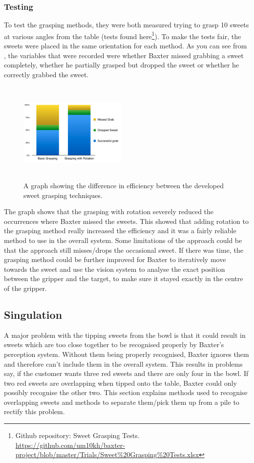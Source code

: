 \subsubsection{Testing}
To test the grasping methods, they were both measured trying to grasp 10 sweets at various angles from the table (tests found here\footnote{Github repository: Sweet Grasping Tests. \url{https://github.com/um10kh/baxter-project/blob/master/Trials/Sweet\%20Grasping\%20Tests.xlsx}}). To make the tests fair, the sweets were placed in the same orientation for each method. As you can see from \textbf{}, the variables that were recorded were whether Baxter missed grabbing a sweet completely, whether he partially grasped but dropped the sweet or whether he correctly grabbed the sweet.
\captionsetup[figure]{justification=centering}
\begin{figure}[H]
        \centering 
        \includegraphics[width=0.475\textwidth, height=5cm]{sweetgrasptests.png}
        \caption{A graph showing the difference in efficiency between the developed sweet grasping techniques.}
        \label{fig:graspTests}
\end{figure}
The graph shows that the grasping with rotation severely reduced the occurrences where Baxter missed the sweets. This showed that adding rotation to the grasping method really increased the efficiency and it was a fairly reliable method to use in the overall system. Some limitations of the approach could be that the approach still misses/drops the occasional sweet. If there was time, the grasping method could be further improved for Baxter to iteratively move towards the sweet and use the vision system to analyse the exact position between the gripper and the target, to make sure it stayed exactly in the centre of the gripper.
\subsection{Singulation}
A major problem with the tipping sweets from the bowl is that it could result in sweets which are too close together to be recognised properly by Baxter's perception system. Without them being properly recognised, Baxter ignores them and therefore can't include them in the overall system. This results in problems say, if the customer wants three red sweets and there are only four in the bowl. If two red sweets are overlapping when tipped onto the table, Baxter could only possibly recognise the other two. This section explains methods used to recognise overlapping sweets and methods to separate them/pick them up from a pile to rectify this problem.
